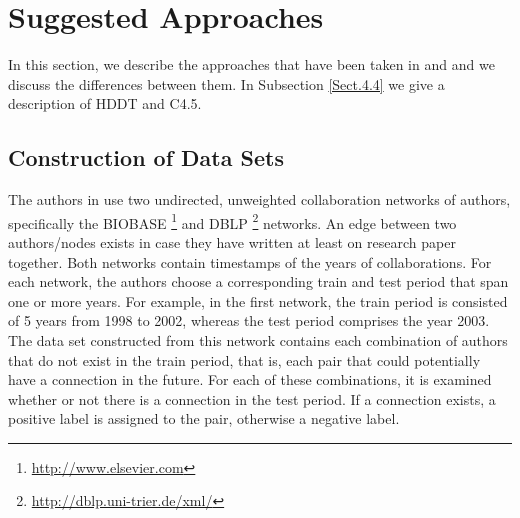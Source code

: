 \documentclass{acm_proc_article-sp}
\begin{document}
\section{Suggested Approaches}
\label{Sect.4}

In this section, we describe the approaches that have been taken in \cite{Hasan06linkprediction} and \cite{Lichtenwalter:2010:NPM:1835804.1835837} and we discuss the differences between them. In Subsection \ref{Sect.4.4} we give a description of HDDT and C4.5.

\subsection{Construction of Data Sets}

The authors in \cite{Hasan06linkprediction} use two undirected, unweighted collaboration networks of authors, specifically the BIOBASE \footnote{\url{http://www.elsevier.com}} and DBLP \footnote{\url{http://dblp.uni-trier.de/xml/}} networks. An edge between two authors/nodes exists in case they have written at least on research paper together. Both networks contain timestamps of the years of collaborations. For each network, the authors choose a corresponding train and test period that span one or more years. For example, in the first network, the train period is consisted of 5 years from 1998 to 2002, whereas the test period comprises the year 2003. The data set constructed from this network contains each combination of authors that do not exist in the train period, that is, each pair that could potentially have a connection in the future. For each of these combinations, it is examined whether or not there is a connection in the test period. If a connection exists, a positive label is assigned to the pair, otherwise a negative label. 
\end{document}
